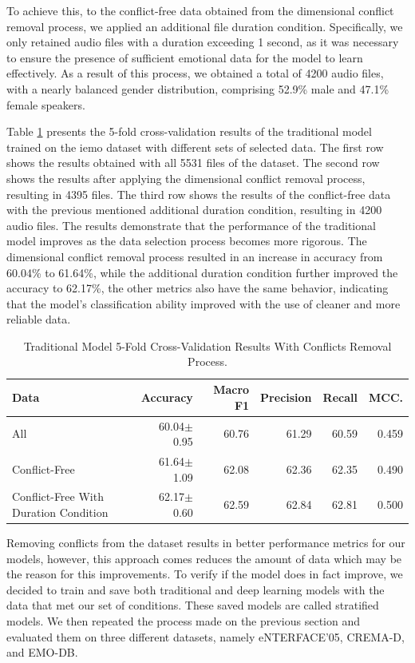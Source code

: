To achieve this, to the conflict-free data obtained from the dimensional conflict removal process, we applied an additional file duration condition. Specifically, we only retained audio files with a duration exceeding 1 second, as it was necessary to ensure the presence of sufficient emotional data for the model to learn effectively. As a result of this process, we obtained a total of 4200 audio files, with a nearly balanced gender distribution, comprising 52.9\% male and 47.1\% female speakers.

Table \ref{tab:emo_cat3} presents the 5-fold cross-validation results of the traditional model trained on the \ac{iemo} dataset with different sets of selected data. The first row shows the results obtained with all 5531 files of the dataset. The second row shows the results after applying the dimensional conflict removal process, resulting in 4395 files. The third row shows the results of the conflict-free data with the previous mentioned additional duration condition, resulting in 4200 audio files. The results demonstrate that the performance of the traditional model improves as the data selection process becomes more rigorous. The dimensional conflict removal process resulted in an increase in accuracy from 60.04\% to 61.64\%, while the additional duration condition further improved the accuracy to 62.17\%, the other metrics also have the same behavior, indicating that the model's classification ability improved with the use of cleaner and more reliable data.

\begin{table}[H]
	\small
	\centering
	\caption{Traditional Model 5-Fold Cross-Validation Results With Conflicts Removal Process.}
	\label{tab:emo_cat3}
	\centering
	\begin{tabular}{lrrrrr}
		\toprule
		Data   						 	& Accuracy    & Macro F1    & Precision   & Recall      & MCC.       \\
		\midrule
		All		      & 60.04$\pm$0.95 & 60.76 & 61.29 & 60.59 & 0.459 \\
		Conflict-Free & 61.64$\pm$1.09 & 62.08 & 62.36 & 62.35 & 0.490 \\
		Conflict-Free With Duration Condition & 62.17$\pm$0.60 & 62.59 & 62.84 & 62.81 & 0.500 \\
		\bottomrule
	\end{tabular}
\end{table}

Removing conflicts from the dataset results in better performance metrics for our models, however, this approach comes reduces the amount of data which may be the reason for this improvements. To verify if the model does in fact improve, we decided to train and save both traditional and deep learning models with the data that met our set of conditions. These saved models are called stratified models. We then repeated the process made on the previous section and evaluated them on three different datasets, namely eNTERFACE'05, CREMA-D, and EMO-DB.

